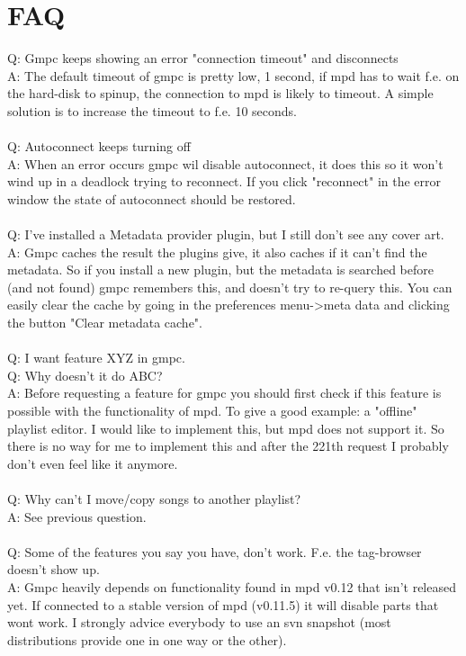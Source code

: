 \documentclass{article}
\begin{document}
\section{FAQ}
Q: Gmpc keeps showing an error "connection timeout" and disconnects\\
A: The default timeout of gmpc is pretty low, 1 second, if mpd has to wait f.e. on the hard-disk to spinup, the connection to mpd is likely to timeout. A simple solution is to increase the timeout to f.e. 10 seconds.\\
\\
Q: Autoconnect keeps turning off\\
A: When an error occurs gmpc wil disable autoconnect, it does this so it won't wind up in a deadlock trying to reconnect. If you click "reconnect" in the error window the state of autoconnect should be restored.\\
\\
Q: I've installed a Metadata provider plugin, but I still don't see any cover art.\\
A: Gmpc caches the result the plugins give, it also caches if it can't find the metadata. So if you install a new plugin, but the metadata is searched before (and not found) gmpc remembers this, and doesn't try to re-query this. You can easily clear the cache by going in the preferences menu->meta data and clicking the button "Clear metadata cache".\\
\\
Q: I want feature XYZ in gmpc.\\
Q: Why doesn't it do ABC?\\
A: Before requesting a feature for gmpc you should first check if this feature is possible with the functionality of mpd. To give a good example: a "offline" playlist editor. I would like to implement this, but mpd does not support it. So there is no way for me to implement this and after the 221th request I probably don't even feel like it anymore.\\
\\
Q: Why can't I move/copy songs to another playlist?\\
A: See previous question.\\
\\
Q: Some of the features you say you have, don't work. F.e. the tag-browser doesn't show up.\\
A: Gmpc heavily depends on functionality found in mpd v0.12 that isn't released yet. If connected to a stable version of mpd (v0.11.5) it will disable parts that wont work. I strongly advice everybody to use an svn snapshot (most distributions provide one in one way or the other).\\
\end{document}
